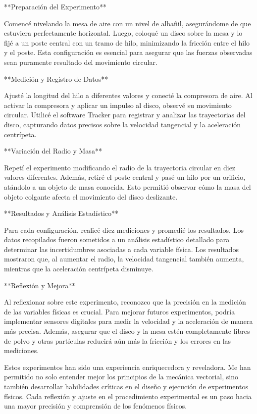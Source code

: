 \documentclass[journal]{IEEEtran}
\begin{document}
**Preparación del Experimento**

Comencé nivelando la mesa de aire con un nivel de albañil, asegurándome de que estuviera perfectamente horizontal. Luego, coloqué un disco sobre la mesa y lo fijé a un poste central con un tramo de hilo, minimizando la fricción entre el hilo y el poste. Esta configuración es esencial para asegurar que las fuerzas observadas sean puramente resultado del movimiento circular.

**Medición y Registro de Datos**

Ajusté la longitud del hilo a diferentes valores y conecté la compresora de aire. Al activar la compresora y aplicar un impulso al disco, observé su movimiento circular. Utilicé el software Tracker para registrar y analizar las trayectorias del disco, capturando datos precisos sobre la velocidad tangencial y la aceleración centrípeta.

**Variación del Radio y Masa**

Repetí el experimento modificando el radio de la trayectoria circular en diez valores diferentes. Además, retiré el poste central y pasé un hilo por un orificio, atándolo a un objeto de masa conocida. Esto permitió observar cómo la masa del objeto colgante afecta el movimiento del disco deslizante.

**Resultados y Análisis Estadístico**

Para cada configuración, realicé diez mediciones y promedié los resultados. Los datos recopilados fueron sometidos a un análisis estadístico detallado para determinar las incertidumbres asociadas a cada variable física. Los resultados mostraron que, al aumentar el radio, la velocidad tangencial también aumenta, mientras que la aceleración centrípeta disminuye.

**Reflexión y Mejora**

Al reflexionar sobre este experimento, reconozco que la precisión en la medición de las variables físicas es crucial. Para mejorar futuros experimentos, podría implementar sensores digitales para medir la velocidad y la aceleración de manera más precisa. Además, asegurar que el disco y la mesa estén completamente libres de polvo y otras partículas reducirá aún más la fricción y los errores en las mediciones.

Estos experimentos han sido una experiencia enriquecedora y reveladora. Me han permitido no solo entender mejor los principios de la mecánica vectorial, sino también desarrollar habilidades críticas en el diseño y ejecución de experimentos físicos. Cada reflexión y ajuste en el procedimiento experimental es un paso hacia una mayor precisión y comprensión de los fenómenos físicos.
\end{document}
